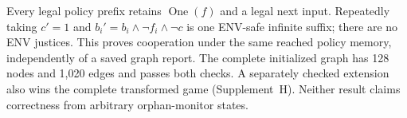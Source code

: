 Every legal policy prefix retains $\operatorname{One}(f)$ and a legal
next input. Repeatedly taking $c'=1$ and
$b_i'=b_i\land\neg f_i\land\neg c$ is one ENV-safe infinite suffix;
there are no ENV justices. This proves cooperation under the same
reached policy memory, independently of a saved graph report.
The complete initialized graph has 128 nodes and 1,020 edges and passes
both checks. A separately checked extension also wins the complete
transformed game (Supplement~H). Neither result claims correctness
from arbitrary orphan-monitor states.
